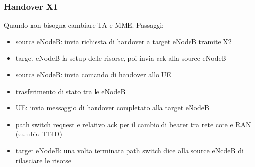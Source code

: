 \subsubsection{Handover X1}

Quando non bisogna cambiare TA e MME. Passaggi: 
\begin{itemize}
    \item source eNodeB: invia richiesta di handover a target eNodeB tramite X2
    
    \item target eNodeB fa setup delle risorse, poi invia ack alla source eNodeB
    
    \item source eNodeB: invia comando di handover allo UE
    
    \item trasferimento di stato tra le eNodeB
    
    \item UE: invia messaggio di handover completato alla target eNodeB
    
    \item path switch request e relativo ack per il cambio di bearer tra rete core e RAN (cambio TEID)
    
    \item target eNodeB: una volta terminata path switch dice alla source eNodeB di rilasciare le risorse
\end{itemize}